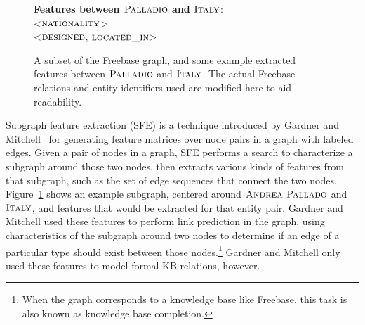 \documentclass[11pt]{article}
\newcommand{\figref}[1]{Figure~\ref{fig:#1}}
\newcommand{\predicate}[1]{\ensuremath{\textsc{#1}}}
\newcommand{\entity}[1]{\ensuremath{\textsc{#1}}}
\begin{document}
\begin{figure}
  {\center
  }
  \textbf{Features between \entity{Palladio} and \entity{Italy}}:\\
  \textless\predicate{nationality}\textgreater\\
  \textless\predicate{designed}, \predicate{located\_in}\textgreater
  \caption{A subset of the Freebase graph, and some example extracted features
  between \entity{Palladio} and \entity{Italy}.  The actual Freebase relations
  and entity identifiers used are modified here to aid readability.}
  \label{fig:sfe}
\end{figure}

Subgraph feature extraction (SFE) is a technique introduced by Gardner and
Mitchell~ for generating feature matrices over node
pairs in a graph with labeled edges.  Given a pair of nodes in a graph, SFE
performs a search to characterize a subgraph around those two nodes, then
extracts various kinds of features from that subgraph, such as the set of edge
sequences that connect the two nodes.  \figref{sfe} shows an example subgraph,
centered around \entity{Andrea Pallado} and \entity{Italy}, and features that
would be extracted for that entity pair.  Gardner and Mitchell used these
features to perform link prediction in the graph, using characteristics of the
subgraph around two nodes to determine if an edge of a particular type should
exist between those nodes.\footnote{When the graph corresponds to a knowledge
base like Freebase, this task is also known as knowledge base completion.}
Gardner and Mitchell only used these features to model formal KB relations,
however.
\end{document}
